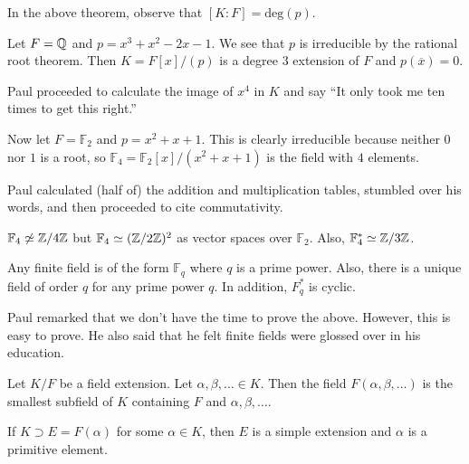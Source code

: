 \documentclass[10pt, twoside]{article}
\newcommand{\F}{\mathbb{F}}
\begin{document}
    \begin{rmk}
        In the above theorem, observe that $[K:F] = \mathrm{deg}(p)$.
    \end{rmk}

    \begin{exm}
        Let $F = \mathbb{Q}$ and $p = x^3 + x^2 - 2x -1$. We see that $p$ is irreducible by the rational root theorem. Then $K = F[x]/(p)$ is a degree $3$ extension of $F$ and $p(\overline{x}) = 0$.
    \end{exm}

    Paul proceeded to calculate the image of $x^4$ in $K$ and say ``It only took me ten times to get this right.''

    \begin{exm}
        Now let $F = \F_2$ and $p = x^2 + x + 1$. This is clearly irreducible because neither $0$ nor $1$ is a root, so $\F_4 = \F_2[x]/(x^2+x+1)$ is the field with $4$ elements.
    \end{exm}

    Paul calculated (half of) the addition and multiplication tables, stumbled over his words, and then proceeded to cite commutativity.

    \begin{rmk}
        $\F_4 \not \simeq \Z/4\Z$ but $\F_4 \simeq (\Z/2\Z)^2$ as vector spaces over $\F_2$. Also, $\F_4^* \simeq \Z/3\Z$.
    \end{rmk}

    \begin{rmk}
        Any finite field is of the form $\F_q$ where $q$ is a prime power. Also, there is a unique field of order $q$ for any prime power $q$. In addition, $F_q^*$ is cyclic.
    \end{rmk}

    Paul remarked that we don't have the time to prove the above. However, this is easy to prove. He also said that he felt finite fields were glossed over in his education.

    \begin{defn}
        Let $K/F$ be a field extension. Let $\alpha, \beta, \ldots \in K$. Then the field $F(\alpha, \beta, \ldots)$ is the smallest subfield of $K$ containing $F$ and $\alpha, \beta, \ldots$.
    \end{defn}

    \begin{defn}
        If $K \supset E = F(\alpha)$ for some $\alpha \in K$, then $E$ is a simple extension and $\alpha$ is a primitive element.
    \end{defn}
\end{document}

